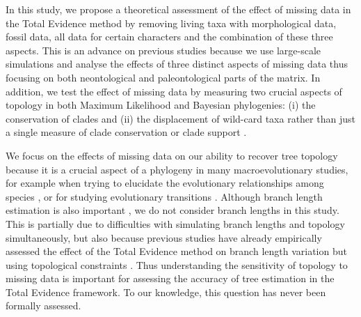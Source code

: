 In this study, we propose a theoretical assessment of the effect of missing data in the Total Evidence method by removing living taxa with morphological data, fossil data, all data for certain characters and the combination of these three aspects.
This is an advance on previous studies because we use large-scale simulations and analyse the effects of three distinct aspects of missing data thus focusing on both neontological and paleontological parts of the matrix.
In addition, we test the effect of missing data by measuring two crucial aspects of topology in both Maximum Likelihood and Bayesian phylogenies: (i) the conservation of clades \citep[based on the Robinson-Foulds distance;][]{RF1981} and (ii) the displacement of wild-card taxa \citep[based on the Triplets distance;][]{critchlowthe1996} rather than just a single measure of clade conservation or clade support \citep[cf.][]{Wiens01102005,pattinsonphylogeny2014}.

We focus on the effects of missing data on our ability to recover tree topology because it is a crucial aspect of a phylogeny in many macroevolutionary studies, for example when trying to elucidate the evolutionary relationships among species \citep[e.g.][]{meredithimpacts2011,jetzthe2012}, or for studying evolutionary transitions \citep[e.g.][]{friedmanexplosive2010}.
Although branch length estimation is also important \citep[namely for timing extinction and/or speciation events; e.g.][]{ronquista2012}, we do not consider branch lengths in this study.
This is partially due to difficulties with simulating branch lengths and topology simultaneously, but also because previous studies have already empirically assessed the effect of the Total Evidence method on branch length variation but using topological constraints \citep{ronquista2012,schragocombining2013,slaterphylogenetic2013,beckancient2014}.
Thus understanding the sensitivity of topology to missing data is important for assessing the accuracy of tree estimation in the Total Evidence framework. To our knowledge, this question has never been formally assessed.

